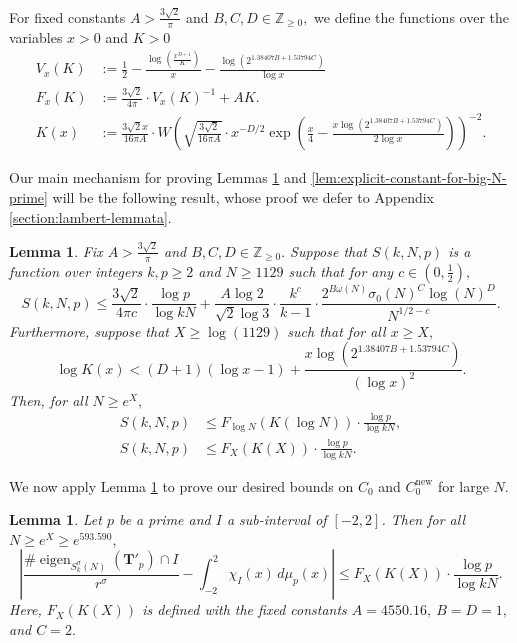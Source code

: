 \documentclass[11pt,letterpaper,reqno]{amsart}
\newtheorem{lemma}[theorem]{Lemma}
\theoremstyle{definition}
\numberwithin{equation}{section}
\numberwithin{figure}{section}
\numberwithin{table}{section}
\newcommand{\nw}{\mathrm{new}}
\begin{document}
For fixed constants $A > \frac{3\sqrt{2}}{\pi}$ and $B, C, D \in \mathbb{Z}_{\geq 0},$ we define the functions over the variables $x > 0$ and $K > 0$
\begin{align}
        V_x(K) &:= \frac{1}{2} - \frac{\log\left( \frac{x^{D + 1}}{K}  \right)}{x} - \frac{\log \left( 2^{1.38407B +  1.53794C}  \right)}{\log x}\\
        F_x(K) &:= \frac{3\sqrt{2}}{4\pi} \cdot V_x(K)^{-1} + AK.\\
        K(x) &:= \frac{3\sqrt{2} x}{16 \pi A} \cdot W\! \left( \sqrt{\frac{3\sqrt{2}}{16 \pi A}} \cdot x^{-D/2} \exp\left( \frac{x}{4} - \frac{x \log\left( 2^{1.38407B +  1.53794C}  \right)}{2\log x}  \right)  \right)^{-2}.
    \end{align}

Our main mechanism for proving Lemmas \ref{lem:explicit-constant-for-big-N} and \ref{lem:explicit-constant-for-big-N-prime} will be the following result, whose proof we defer to Appendix \ref{section:lambert-lemmata}.


\begin{lemma}\label{lem:lambert-w-function}
    Fix $A > \frac{3\sqrt{2}}{\pi}$ and $B, C, D \in \mathbb{Z}_{\geq 0}.$ Suppose that $S(k, N, p)$ is a function over integers $k, p \geq 2$ and $N \geq 1129$ such that for any $c \in \left( 0, \frac{1}{2} \right),$
    $$S(k, N, p) \leq \frac{3\sqrt{2}}{4\pi c} \cdot \frac{\log p}{\log kN} + \frac{A\log 2}{\sqrt{2} \log 3} \cdot \frac{k^c}{k - 1} \cdot \frac{2^{ B\omega(N)} \sigma_0(N)^C \log(N)^D}{N^{1/2 - c}}.$$
    Furthermore, suppose that $X \geq \log(1129)$ such that for all $x \geq X,$
    \begin{equation}
            \log K(x) < (D + 1) \left( \log x - 1 \right) + \frac{x \log\left( 2^{1.38407B +  1.53794C} \right)}{\left( \log x \right)^2}. 
            \label{eqn:criteron-for-F-decreasing}
        \end{equation}
    Then, for all $N \geq e^X,$
    \begin{align}
        S(k, N, p) &\leq F_{\log N} \left( K(\log N)  \right) \cdot \frac{\log p}{\log kN},\\
        S(k, N, p) &\leq F_X(K(X)) \cdot \frac{\log p}{\log kN}.
    \end{align}
\end{lemma}

We now apply Lemma \ref{lem:lambert-w-function} to prove our desired bounds on $C_0$ and $C_0^\nw$ for large $N.$

    \begin{lemma}\label{lem:explicit-constant-for-big-N}
    Let $p$ be a prime and $I$ a sub-interval of $[-2, 2]$. Then for all $N \geq e^X \geq e^{593.590},$
        $$\left| \frac{\# \operatorname{eigen}_{S_k^\sigma(N)}(\mathbf{T}'_p) \cap I}{r^\sigma} - \int_{-2}^2 \chi_I (x) \, d \mu_p(x)  \right| \leq F_{X}(K(X)) \cdot \frac{\log p}{\log kN}.$$
    Here, $F_X(K(X))$ is defined with the fixed constants $A = 4550.16, \ B = D = 1,$ and $C = 2.$
\end{lemma}
\end{document}
